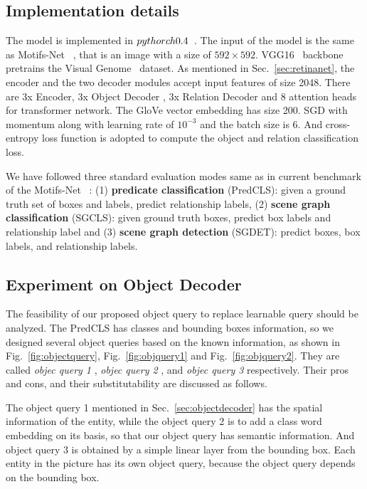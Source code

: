 \subsection{Implementation details}
 The model is implemented in $ pythorch\-0.4 $~\cite{paszke2019pytorch}. The input of the model is the same as Motifs-Net~\cite{zellers2018neural} , that is an image with a size of $ 592 \times 592 $. VGG16~\cite{simonyan2015deep} backbone pretrains the Visual Genome~\cite{krishna2017visual} dataset. As mentioned in  Sec.~\ref{sec:retinanet}, the encoder and the two decoder modules accept input features of size 2048. There are 3x Encoder, 3x Object Decoder , 3x Relation Decoder and 8 attention heads for transformer network. The GloVe vector embedding has size 200. SGD with momentum along with learning rate of $ 10^{-3 }$ and the batch size is 6. And cross-entropy loss function is adopted to compute the object and relation classification loss.

 We have followed three standard evaluation modes same as in current benchmark of the Motifs-Net~\cite{zellers2018neural} : (1) \textbf{predicate classification} (PredCLS): given a ground truth set of boxes and labels, predict relationship labels, (2) \textbf{scene graph classification} (SGCLS): given ground truth boxes, predict box labels and relationship label and (3) \textbf{scene graph detection} (SGDET): predict boxes, box labels, and relationship labels.


\subsection{Experiment on Object Decoder}

The feasibility of our proposed object query to replace learnable query should be analyzed. The  PredCLS has classes and bounding boxes information, so we designed several object queries based on the known information, as shown in Fig.~\ref{fig:objectquery}, Fig.~\ref{fig:objquery1} and Fig.~\ref{fig:objquery2}. They are called  \textit{objec query 1} ,  \textit{objec query 2} , and  \textit{objec query 3}  respectively. Their pros and cons, and their substitutability are discussed  as follows.

The object query 1 mentioned in Sec.~\ref{sec:objectdecoder} has the spatial information of the entity, while the object query 2 is to add a class word embedding on its basis, so that our object query has semantic information. And object query 3 is obtained by a simple linear layer from the bounding box. Each entity in the picture has its own object query, because the object query depends on the bounding box.

